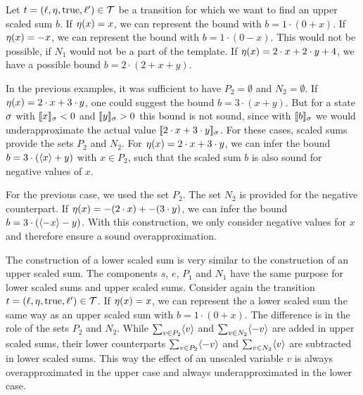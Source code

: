 \begin{example}
  Let $t = (\ell,\eta,\text{true},\ell') \in \mathcal{T}$ be a transition for which we want to find an upper scaled sum $b$.
  If $\eta(x) = x$, we can represent the bound with $b = 1 \cdot (0 + x)$.
  If $\eta(x) = -x$, we can represent the bound with $b = 1 \cdot (0 - x)$.
  This would not be possible, if $N_1$ would not be a part of the template.
  If $\eta(x) = 2 \cdot x + 2 \cdot y + 4$, we have a possible bound $b = 2 \cdot (2 + x + y)$.
  
  In the previous examples, it was sufficient to have $P_2 = \emptyset$ and $N_2 = \emptyset$.
  If $\eta(x) = 2 \cdot x + 3 \cdot y$, one could suggest the bound $b = 3 \cdot (x + y)$.
  But for a state $\sigma$ with $\llbracket x \rrbracket_{\sigma} < 0$ and $\llbracket y \rrbracket_{\sigma} > 0$ this bound is not sound, since with $\llbracket b \rrbracket_{\sigma}$ we would underapproximate the actual value $\llbracket 2 \cdot x + 3 \cdot y \rrbracket_{\sigma}$.
  For these cases, scaled sums provide the sets $P_2$ and $N_2$.
  For $\eta(x) = 2 \cdot x + 3 \cdot y$, we can infer the bound $b = 3 \cdot (\langle x\rangle + y)$ with $x \in P_2$, such that the scaled sum $b$ is also sound for negative values of $x$.
  
  For the previous case, we used the set $P_2$.
  The set $N_2$ is provided for the negative counterpart.
  If $\eta(x) = -(2 \cdot x) + -(3 \cdot y)$, we can infer the bound $b = 3 \cdot (\langle-x\rangle - y)$.
  With this construction, we only consider negative values for $x$ and therefore ensure a sound overapproximation.
  
  The construction of a lower scaled sum is very similar to the construction of an upper scaled sum.
  The components $s$, $e$, $P_1$ and $N_1$ have the same purpose for lower scaled sums and upper scaled sums.
  Consider again the transition $t = (\ell,\eta,\text{true},\ell') \in \mathcal{T}$.
  If $\eta(x) = x$, we can represent the a lower scaled sum the same way as an upper scaled sum with $b = 1 \cdot (0 + x)$.
  The difference is in the role of the sets $P_2$ and $N_2$.
  While $\sum_{v \in P_2} \langle v\rangle$ and $\sum_{v \in N_2} \langle-v\rangle$ are added in upper scaled sums, their lower counterparts $\sum_{v \in P_2} \langle-v\rangle$ and $\sum_{v \in N_2} \langle v\rangle$ are subtracted in lower scaled sums.
  This way the effect of an unscaled variable $v$ is always overapproximated in the upper case and always underapproximated in the lower case.
\end{example}

